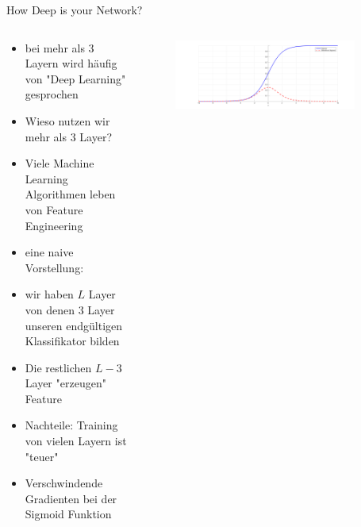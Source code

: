 \documentclass[aspectratio=1610, xcolor=dvipsnames, 9pt]{beamer}
\begin{document}
      \begin{frame}{ How Deep is your Network?}
        \begin{columns}
          \begin{column}{0.6\textwidth}
            \begin{itemize}
              \item bei mehr als 3 Layern wird häufig von "Deep Learning" gesprochen
              \item Wieso nutzen wir mehr als 3 Layer?
              \item Viele Machine Learning Algorithmen leben von Feature Engineering
              \item eine naive Vorstellung:
              \item wir haben $L$ Layer von denen 3 Layer unseren endgültigen Klassifikator bilden
              \item Die restlichen $L-3$ Layer "erzeugen" Feature
              \item Nachteile: Training von vielen Layern ist "teuer"
              \item Verschwindende Gradienten bei der Sigmoid Funktion
            \end{itemize}
          \end{column}
           \begin{column}{0.4\textwidth}
             \begin{figure}
               \centering
                           \includegraphics[width=0.9\textwidth]{images/sigmoid.png}
               \end{figure}
           \end{column}
        \end{columns}
      \end{frame}
\end{document}
